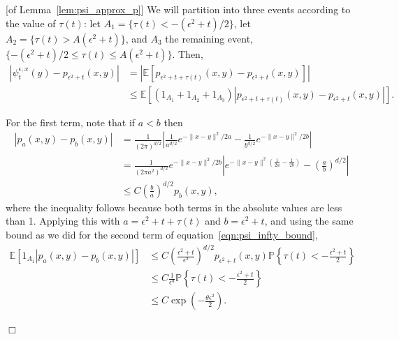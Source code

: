 \documentclass[12pt]{article}
\newenvironment {proof}{{\noindent\bf Proof }}{\hfill $\Box$ \medskip}
\newcommand{\IP}{\mathbb P}
\newcommand{\IE}{\mathbb E}
\begin{document}
\begin{proof}[of Lemma~\ref{lem:psi_approx_p}]
    We will partition into three events according to the value of $\tau(t)$:
    let $A_1 = \{ \tau(t) < - (\epsilon^2 + t)/2 \}$,
    let $A_2 = \{ \tau(t) > A(\epsilon^2 + t) \}$,
    and $A_3$ the remaining event, $\{ - (\epsilon^2 + t)/2 \le \tau(t) \le A(\epsilon^2 + t) \}$.
    Then,
    \begin{align*}
        \left|
            \psi_t^{\epsilon, x}(y)
            -
            p_{\epsilon^2 + t}(x, y)
        \right|
        &=
        \left|
        \IE\left[
            p_{\epsilon^2 + t + \tau(t)}(x, y)
            -
            p_{\epsilon^2 + t}(x, y)
        \right]
        \right|
        \\&\le
        \IE\left[
            (1_{A_1} + 1_{A_2} + 1_{A_3})
            \left|
            p_{\epsilon^2 + t + \tau(t)}(x, y)
            -
            p_{\epsilon^2 + t}(x, y)
        \right|
        \right] .
    \end{align*}

    For the first term, note that if $a < b$ then
    \begin{align*}
        |p_a(x, y) - p_b(x, y)| 
        &=
        \frac{1}{(2\pi)^{d/2}}
        \left|
            \frac{1}{a^{d/2}}
            e^{-\|x - y\|^2 / 2a}
            -
            \frac{1}{b^{d/2}}
            e^{-\|x - y\|^2 / 2b}
        \right|
        \\ &=
        \frac{1}{(2\pi a^2)^{d/2}}
            e^{-\|x - y\|^2 / 2b}
        \left|
            e^{-\|x - y\|^2 \left(\frac{1}{2a} - \frac{1}{2b}\right)}
            -
            \left(\frac{a}{b}\right)^{d/2}
        \right|
        \\ &\le
        C \left(\frac{b}{a}\right)^{d/2}
        p_b(x, y) ,
    \end{align*}
    where the inequality follows because both terms in the absolute values are less than 1.
    Applying this with $a = \epsilon^2 + t + \tau(t)$ and $b = \epsilon^2 + t$,
    and using the same bound as we did for the second term of equation~\ref{eqn:psi_infty_bound},
    \begin{align*}
        \IE\left[
            1_{A_1} |p_a(x, y) - p_b(x, y)| 
        \right]
        & \le
            C \left(\frac{\epsilon^2 + t}{\epsilon^2}\right)^{d/2}
            p_{\epsilon^2 + t}(x, y) 
            \IP\left\{ \tau(t) < - \frac{\epsilon^2 + t}{2} \right\}
        \\ & \le
            C \frac{1}{\epsilon^d}
            \IP\left\{ \tau(t) < - \frac{\epsilon^2 + t}{2} \right\}
        \\ & \le
        C \exp\left(-\frac{\theta \epsilon^2}{2} \right) .
    \end{align*}


\end{proof}
\end{document}
